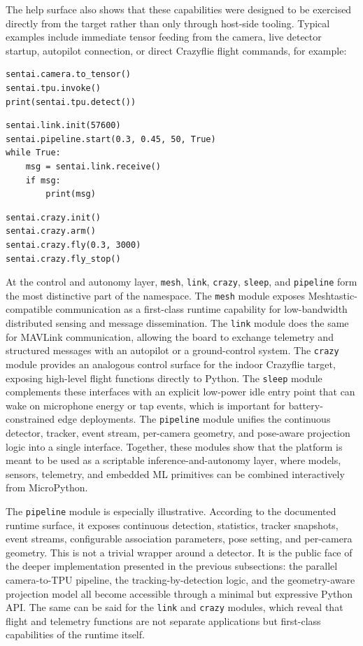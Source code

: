 The help surface also shows that these capabilities were designed to be
exercised directly from the target rather than only through host-side
tooling. Typical examples include immediate tensor feeding from the
camera, live detector startup, autopilot connection, or direct Crazyflie
flight commands, for example:

\begin{verbatim}
sentai.camera.to_tensor()
sentai.tpu.invoke()
print(sentai.tpu.detect())
\end{verbatim}

\begin{verbatim}
sentai.link.init(57600)
sentai.pipeline.start(0.3, 0.45, 50, True)
while True:
    msg = sentai.link.receive()
    if msg:
        print(msg)
\end{verbatim}

\begin{verbatim}
sentai.crazy.init()
sentai.crazy.arm()
sentai.crazy.fly(0.3, 3000)
sentai.crazy.fly_stop()
\end{verbatim}

At the control and autonomy layer, \texttt{mesh}, \texttt{link},
\texttt{crazy}, \texttt{sleep}, and \texttt{pipeline} form the most
distinctive part of the namespace. The \texttt{mesh} module exposes
Meshtastic-compatible communication as a first-class runtime capability
for low-bandwidth distributed sensing and message dissemination. The
\texttt{link} module does the same for MAVLink communication, allowing
the board to exchange telemetry and structured messages with an
autopilot or a ground-control system. The \texttt{crazy} module provides
an analogous control surface for the indoor Crazyflie target, exposing
high-level flight functions directly to Python. The \texttt{sleep}
module complements these interfaces with an explicit low-power idle
entry point that can wake on microphone energy or tap events, which is
important for battery-constrained edge deployments. The
\texttt{pipeline} module unifies the continuous detector, tracker, event
stream, per-camera geometry, and pose-aware projection logic into a
single interface. Together, these modules show that the platform is
meant to be used as a scriptable inference-and-autonomy layer, where
models, sensors, telemetry, and embedded ML primitives can be combined
interactively from MicroPython.

The \texttt{pipeline} module is especially illustrative. According to
the documented runtime surface, it exposes continuous detection,
statistics, tracker snapshots, event streams, configurable association
parameters, pose setting, and per-camera geometry. This is not a trivial
wrapper around a detector. It is the public face of the deeper
implementation presented in the previous subsections: the parallel
camera-to-TPU pipeline, the tracking-by-detection logic, and the
geometry-aware projection model all become accessible through a minimal
but expressive Python API. The same can be said for the \texttt{link}
and \texttt{crazy} modules, which reveal that flight and telemetry
functions are not separate applications but first-class capabilities of
the runtime itself.

